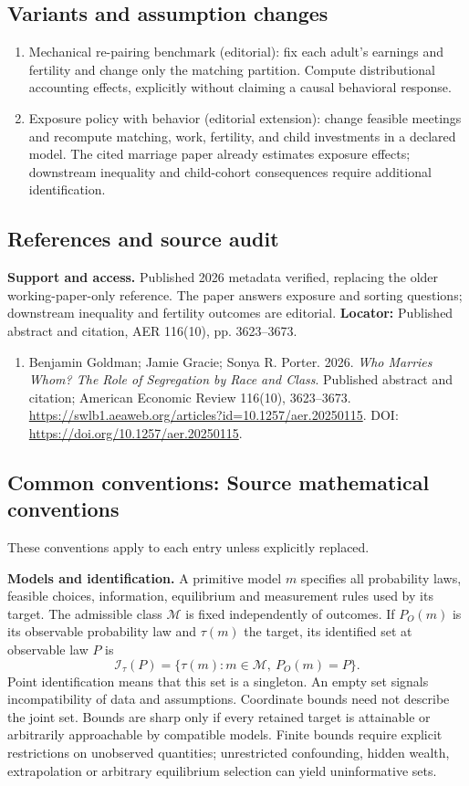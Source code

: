 \documentclass[11pt,a4paper]{article}
\begin{document}
\subsection*{Variants and assumption changes}
\begin{enumerate}
\item Mechanical re-pairing benchmark (editorial): fix each adult's earnings and fertility and change only the matching partition. Compute distributional accounting effects, explicitly without claiming a causal behavioral response.
\item Exposure policy with behavior (editorial extension): change feasible meetings and recompute matching, work, fertility, and child investments in a declared model. The cited marriage paper already estimates exposure effects; downstream inequality and child-cohort consequences require additional identification.
\end{enumerate}
\subsection*{References and source audit}
\textbf{Support and access.} Published 2026 metadata verified, replacing the older working-paper-only reference. The paper answers exposure and sorting questions; downstream inequality and fertility outcomes are editorial. \textbf{Locator:} Published abstract and citation, AER 116(10), pp. 3623--3673.
\begin{enumerate}\raggedright
\item\hypertarget{definitions:source:30007649:1}{} Benjamin Goldman; Jamie Gracie; Sonya R. Porter. 2026. \emph{Who Marries Whom? The Role of Segregation by Race and Class}. Published abstract and citation; American Economic Review 116(10), 3623--3673.
\url{https://swlb1.aeaweb.org/articles?id=10.1257/aer.20250115}.
DOI: \url{https://doi.org/10.1257/aer.20250115}.
\end{enumerate}

\subsection*{Common conventions: Source mathematical conventions}

These conventions apply to each entry unless explicitly replaced.

\textbf{Models and identification.} A primitive model \(m\) specifies all probability laws, feasible choices, information, equilibrium and measurement rules used by its target. The admissible class \(\mathcal M\) is fixed independently of outcomes. If \(P_O(m)\) is its observable probability law and \(\tau(m)\) the target, its identified set at observable law \(P\) is
\[
 \mathcal I_\tau(P)=\{\tau(m):m\in\mathcal M,\ P_O(m)=P\}.
\]
Point identification means that this set is a singleton. An empty set signals incompatibility of data and assumptions. Coordinate bounds need not describe the joint set. Bounds are sharp only if every retained target is attainable or arbitrarily approachable by compatible models. Finite bounds require explicit restrictions on unobserved quantities; unrestricted confounding, hidden wealth, extrapolation or arbitrary equilibrium selection can yield uninformative sets.
\end{document}
